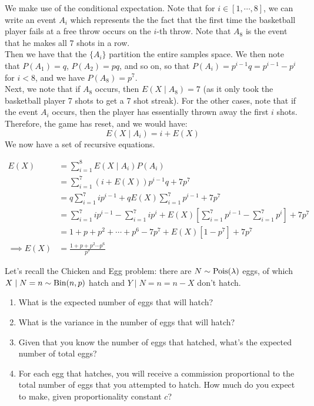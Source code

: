 \documentclass[11pt]{article}
\begin{document}
\begin{solution}
We make use of the conditional expectation. Note that for $i \in [1,\cdots, 8]$, we can write an event $A_i$ which represents the the fact that the first time the basketball player fails at a free throw occurs on the $i$-th throw. Note that $A_8$ is the event that he makes all $7$ shots in a row.\\

Then we have that the $\{A_i\}$ partition the entire samples space. We then note that $P(A_1) = q$, $P(A_2) = pq$, and so on, so that $P(A_i) = p^{i-1}q = p^{i-1} - p^i$ for $i < 8$, and we have $P(A_8) = p^7$. \\

Next, we note that if $A_8$ occurs, then $E(X \mid A_8) = 7$ (as it only took the basketball player 7 shots to get a 7 shot streak). For the other cases, note that if the event $A_i$ occurs, then the player has essentially thrown away the first $i$ shots. Therefore, the game has reset, and we would have:
$$
E(X \mid  A_i) = i + E(X)
$$
We now have a set of recursive equations.

\begin{align*}
E(X) &= \sum_{i=1}^{8} E(X \mid A_i)P(A_i) \\
&= \sum_{i=1}^7 (i + E(X))p^{i-1}q + 7p^7 \\
&= q\sum_{i=1}^7 ip^{i-1} + qE(X)\sum_{i=1}^7 p^{i-1} + 7p^7 \\
&= \sum_{i=1}^7 ip^{i-1} - \sum_{i=1}^7 ip^i + E(X)[\sum_{i=1}^7 p^{i-1} - \sum_{i=1}^7 p^{i}] + 7p^7 \\
&= 1 + p + p^2 + \cdots + p^6 - 7p^7 + E(X)[1 - p^7] + 7p^7 \\
\implies E(X) &= \frac{1 + p + p^2 \cdots p^6}{p^7}
\end{align*}
\end{solution}


\begin{exercise}
Let's recall the Chicken and Egg problem: there are $N \sim \textrm{Pois}(\lambda)$ eggs, of which $X \mid N =n \sim \textrm{Bin}(n,p)$ hatch and $Y \mid N = n = n - X$ don't hatch.
\begin{enumerate}
\item What is the expected number of eggs that will hatch?
\item What is the variance in the number of eggs that will hatch?
\item Given that you know the number of eggs that hatched, what's the expected number of total eggs?
\item For each egg that hatches, you will receive a commission proportional to the total number of eggs that you attempted to hatch. How much do you expect to make, given proportionality constant $c$?
\end{enumerate}
\end{exercise}
\end{document}
